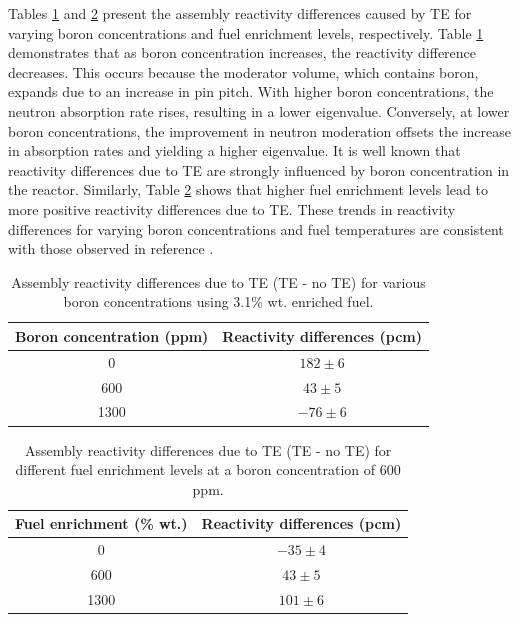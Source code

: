 Tables \ref{tab421} and \ref{tab422} present the assembly reactivity differences caused by TE for varying boron concentrations and fuel enrichment levels, respectively. Table \ref{tab421} demonstrates that as boron concentration increases, the reactivity difference decreases. This occurs because the moderator volume, which contains boron, expands due to an increase in pin pitch. With higher boron concentrations, the neutron absorption rate rises, resulting in a lower eigenvalue. Conversely, at lower boron concentrations, the improvement in neutron moderation offsets the increase in absorption rates and yielding a higher eigenvalue. It is well known that reactivity differences due to TE are strongly influenced by boron concentration in the reactor. Similarly, Table \ref{tab422} shows that higher fuel enrichment levels lead to more positive reactivity differences due to TE. These trends in reactivity differences for varying boron concentrations and fuel temperatures are consistent with those observed in reference \cite{palmtag}.

\begin{table}
    \centering
    \caption[Assembly reactivity differences for various boron concentrations]{Assembly reactivity differences due to TE (TE - no TE) for various boron concentrations using 3.1\% wt. enriched fuel.}
    \label{tab421} 
    \begin{tabular}{| c | c |}
    \hline 
     Boron concentration (ppm) & Reactivity differences (pcm) \\
     \hline
     0        & $182\pm6$     \\ \hline
     600      & $43\pm5$     \\ \hline
     1300     & $-76\pm6$    \\ \hline
    \end{tabular}
\end{table}

\begin{table}
    \centering
    \caption[Assembly reactivity differences for different fuel enrichments]{Assembly reactivity differences due to TE (TE - no TE) for different fuel enrichment levels at a boron concentration of 600 ppm.}
    \label{tab422} 
    \begin{tabular}{| c | c |}
    \hline 
    Fuel enrichment (\% wt.) & Reactivity differences (pcm) \\
     \hline
     0        & $-35\pm4$    \\ \hline
     600      & $43\pm5$     \\ \hline
     1300     & $101\pm6$    \\ \hline
    \end{tabular}
\end{table}

